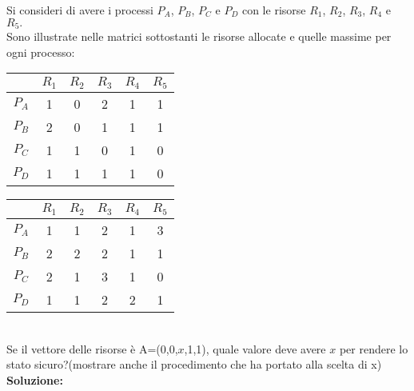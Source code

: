 \documentclass{article}
\begin{document}
    Si consideri di avere i processi $P_A$, $P_B$, $P_C$ e $P_D$ con le risorse $R_1$, $R_2$, $R_3$, $R_4$ e $R_5.$\\
    Sono illustrate nelle matrici sottostanti le risorse allocate e quelle massime per ogni processo:\\
    \begin{minipage}[c]{0.5\textwidth}
        \centering
        \begin{tabular}{|c|c|c|c|c|c|}
            \hline
            & $R_1$ & $R_2$ & $R_3$ & $R_4$ & $R_5$\\
            \hline
            $P_A$ & 1 & 0 & 2 & 1 & 1\\
            \hline
            $P_B$ & 2 & 0 & 1 & 1 & 1\\
            \hline
            $P_C$ & 1 & 1 & 0 & 1 & 0\\
            \hline
            $P_D$ & 1 & 1 & 1 & 1 & 0\\
            \hline
        \end{tabular}
    \end{minipage}
    \begin{minipage}[c]{0.5\textwidth}
        \centering
        \begin{tabular}{|c|c|c|c|c|c|}
            \hline
            & $R_1$ & $R_2$ & $R_3$ & $R_4$ & $R_5$\\
            \hline
            $P_A$ & 1 & 1 & 2 & 1 & 3\\
            \hline
            $P_B$ & 2 & 2 & 2 & 1 & 1\\
            \hline
            $P_C$ & 2 & 1 & 3 & 1 & 0\\
            \hline
            $P_D$ & 1 & 1 & 2 & 2 & 1\\
            \hline
        \end{tabular}
    \end{minipage}\\
    Se il vettore delle risorse è A=(0,0,$x$,1,1), quale valore deve avere $x$ per rendere lo stato sicuro?(mostrare anche il procedimento che ha portato alla scelta di x)\\
    \textbf{Soluzione:}
\end{document}
